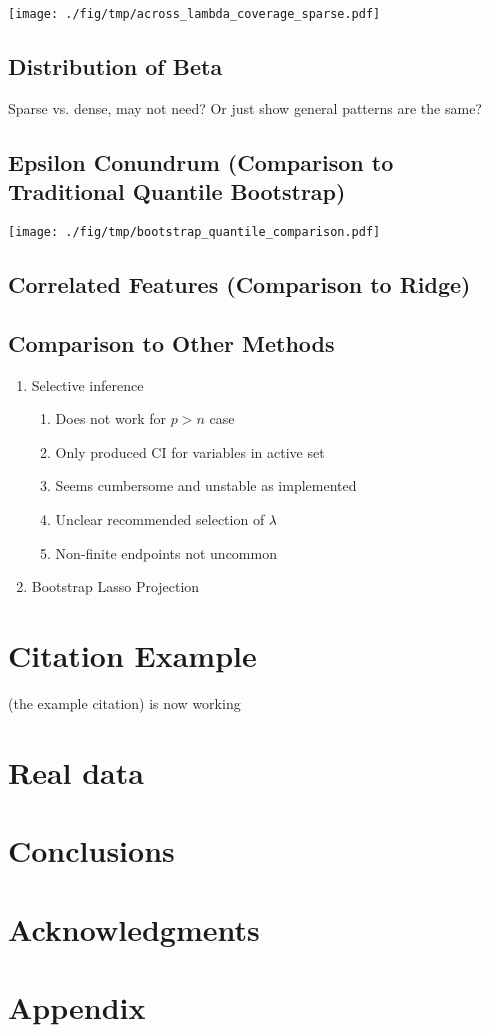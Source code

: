 \texttt{[image: ./fig/tmp/across\_lambda\_coverage\_sparse.pdf]}

\subsection{Distribution of Beta}

Sparse vs. dense, may not need? Or just show general patterns are the same?

\subsection{Epsilon Conundrum (Comparison to Traditional Quantile Bootstrap)}
\texttt{[image: ./fig/tmp/bootstrap\_quantile\_comparison.pdf]}

\subsection{Correlated Features (Comparison to Ridge)}


\subsection{Comparison to Other Methods}

\begin{enumerate}
\item Selective inference
\begin{enumerate}
\item Does not work for $p > n$ case
\item Only produced CI for variables in active set
\item Seems cumbersome and unstable as implemented
\item Unclear recommended selection of $\lambda$
\item Non-finite endpoints not uncommon
\end{enumerate}
\item{Bootstrap Lasso Projection}
\end{enumerate}

\section{Citation Example}
\cite{Tibshirani1996} (the example citation) is now working


\section{Real data}

\section{Conclusions}

\section*{Acknowledgments}

\section*{Appendix}
